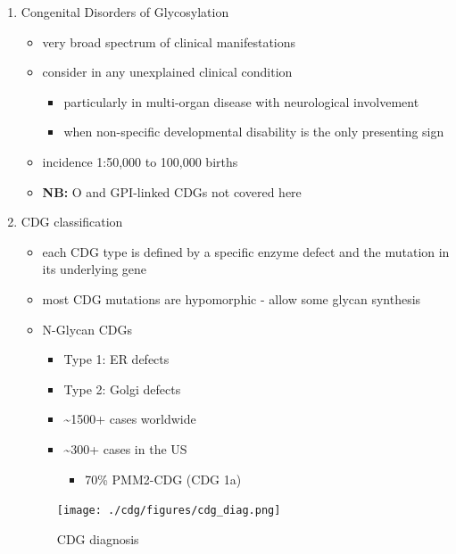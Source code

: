 \documentclass{scrartcl}
\begin{document}
\begin{enumerate}
\item Congenital Disorders of Glycosylation
\label{sec:orgf86e000}
\begin{itemize}
\item very broad spectrum of clinical manifestations
\item consider in any unexplained clinical condition
\begin{itemize}
\item particularly in multi-organ disease with neurological involvement
\item when non-specific developmental disability is the only presenting sign
\end{itemize}
\item incidence 1:50,000 to 100,000 births
\item \textbf{NB:} O and GPI-linked CDGs not covered here
\end{itemize}
\item CDG classification
\label{sec:org21c818e}
\begin{itemize}
\item each CDG type is defined by a specific enzyme defect and the mutation in its underlying gene
\item most CDG mutations are hypomorphic - allow some glycan synthesis
\item N-Glycan CDGs
\begin{itemize}
\item Type 1: ER defects
\item Type 2: Golgi defects
\item \textasciitilde{}1500+ cases worldwide
\item \textasciitilde{}300+ cases in the US
\begin{itemize}
\item 70\% PMM2-CDG (CDG 1a)
\end{itemize}
\end{itemize}
\end{itemize}

\begin{figure}[htbp]
\centering
\texttt{[image: ./cdg/figures/cdg\_diag.png]}
\caption{\label{fig:org4fa6cc9}
CDG diagnosis}
\end{figure}
\end{enumerate}
\end{document}
